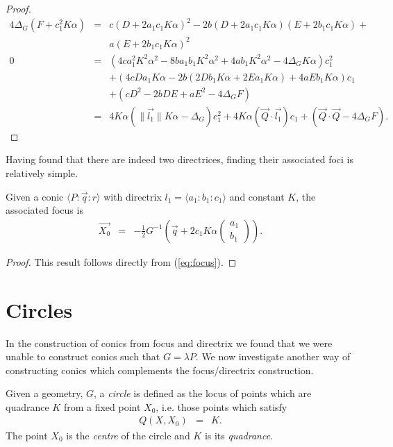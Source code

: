\begin{proof}
\begin{eqnarray*}
4\Delta_G(F + c_1^2K\alpha) & = & c(D + 2a_1c_1K\alpha)^2 -2b(D + 2a_1c_1K\alpha)(E + 2b_1c_1K\alpha) + \\
  &  & a(E + 2b_1c_1K\alpha)^2\\
0 & = & (4ca_1^2K^2\alpha^2 - 8ba_1b_1K^2\alpha^2 + 4ab_1K^2\alpha^2 - 4\Delta_GK\alpha )c_1^2 \\
  &   & + (4cDa_1K\alpha -2b(2Db_1K\alpha + 2Ea_1K\alpha) + 4aEb_1K\alpha)c_1 \\
  &   & + (cD^2 -2bDE + aE^2 - 4\Delta_GF)\\
  & = & 4K\alpha(\|\vec{l_1}\|K\alpha - \Delta_G )c_1^2 + 4K\alpha(\vec{Q}\cdot\vec{l_1})c_1 + (\vec{Q}\cdot\vec{Q} - 4\Delta_GF).
\end{eqnarray*}
\end{proof}

Having found that there are indeed two directrices, finding their associated foci is relatively simple.

\begin{theorem}\label{th:focus}
Given a conic $\langle P\!:\!\vec{q}\!:\!r \rangle$ with directrix $l_1 = \langle a_1\!:\!b_1\!:\!c_1 \rangle$ and constant $K$, the associated focus is
\begin{eqnarray}
\vec{X_0} & = & -\frac{1}{2}G^{-1}\left(\vec{q} + 2c_1K\alpha\begin{pmatrix}a_1 \\ b_1\end{pmatrix} \right).
\end{eqnarray}
\end{theorem}
\begin{proof}
This result follows directly from (\ref{eq:focus}).
\end{proof}


\section{Circles}

In the construction of conics from focus and directrix we found that we were unable to construct conics such that $G = \lambda P$. We now investigate another way of constructing conics which complements the focus/directrix construction.

\begin{definition} Given a geometry, $G$, a \emph{circle} is defined as the locus of points which are quadrance $K$ from a fixed point $X_0$, i.e. those points which satisfy
\begin{eqnarray}
Q(X, X_0) & = & K.\label{circ_eq}
\end{eqnarray}
The point $X_0$ is the \emph{centre} of the circle and $K$ is its \emph{quadrance}.

\end{definition}

